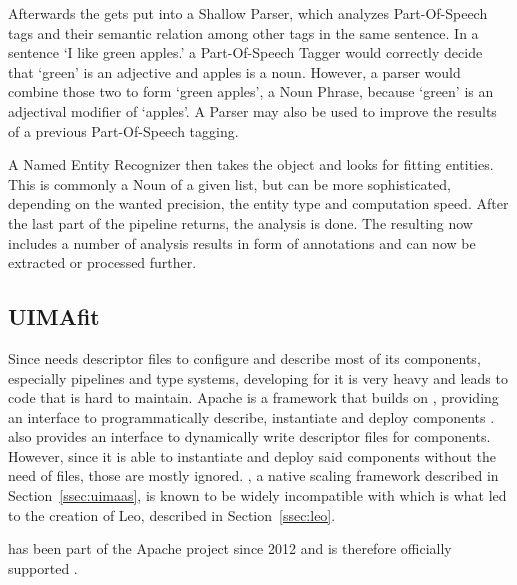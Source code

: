 Afterwards the \cas{} gets put into a Shallow Parser, which analyzes Part-Of-Speech tags and their semantic relation among other tags in the same sentence. In a sentence `I like green apples.' a Part-Of-Speech Tagger would correctly decide that `green' is an adjective and apples is a noun. However, a parser would combine those two to form `green apples', a Noun Phrase, because `green' is an adjectival modifier of `apples'. A Parser may also be used to improve the results of a previous Part-Of-Speech tagging.

A Named Entity Recognizer then takes the \cas{} object and looks for fitting entities. This is commonly a Noun of a given list, but can be more sophisticated, depending on the wanted precision, the entity type and computation speed. After the last part of the pipeline returns, the analysis is done. The resulting \cas{} now includes a number of analysis results in form of annotations and can now be extracted or processed further.

\subsection{UIMAfit}
\label{ssec:uimafit}
Since \uima{} needs \xml{} descriptor files to configure and describe most of its components, especially pipelines and type systems, developing for it is very \xml{} heavy and leads to code that is hard to maintain. Apache \uimafit{} is a framework that builds on \uima{}, providing an interface to programmatically describe, instantiate and deploy \uima{} components \cite{ogren-bethard:2009:SETQA-NLP}. \uimafit{} also provides an interface to dynamically write \xml{} descriptor files for \uima{} components. However, since it is able to instantiate and deploy said components without the need of \xml{} files, those are mostly ignored. \uimaas{}, a native \uima{} scaling framework described in Section~\ref{ssec:uimaas}, is known to be widely incompatible with \uimafit{} which is what led to the creation of Leo, described in Section~\ref{ssec:leo}.

\uimafit{} has been part of the Apache \uima{} project since 2012 and is therefore officially supported \cite{github:uimafit}. 



